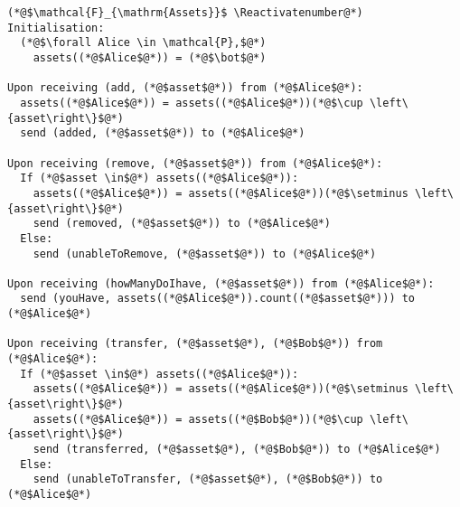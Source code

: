 \Suppressnumber
\begin{lstlisting}[label=assetsfunc, style=numbers]
(*@$\mathcal{F}_{\mathrm{Assets}}$ \Reactivatenumber@*)
Initialisation:
  (*@$\forall Alice \in \mathcal{P},$@*)
    assets((*@$Alice$@*)) = (*@$\bot$@*)

Upon receiving (add, (*@$asset$@*)) from (*@$Alice$@*):
  assets((*@$Alice$@*)) = assets((*@$Alice$@*))(*@$\cup \left\{asset\right\}$@*)
  send (added, (*@$asset$@*)) to (*@$Alice$@*)

Upon receiving (remove, (*@$asset$@*)) from (*@$Alice$@*):
  If (*@$asset \in$@*) assets((*@$Alice$@*)):
    assets((*@$Alice$@*)) = assets((*@$Alice$@*))(*@$\setminus \left\{asset\right\}$@*)
    send (removed, (*@$asset$@*)) to (*@$Alice$@*)
  Else:
    send (unableToRemove, (*@$asset$@*)) to (*@$Alice$@*)

Upon receiving (howManyDoIhave, (*@$asset$@*)) from (*@$Alice$@*):
  send (youHave, assets((*@$Alice$@*)).count((*@$asset$@*))) to (*@$Alice$@*)

Upon receiving (transfer, (*@$asset$@*), (*@$Bob$@*)) from (*@$Alice$@*):
  If (*@$asset \in$@*) assets((*@$Alice$@*)):
    assets((*@$Alice$@*)) = assets((*@$Alice$@*))(*@$\setminus \left\{asset\right\}$@*)
    assets((*@$Alice$@*)) = assets((*@$Bob$@*))(*@$\cup \left\{asset\right\}$@*)
    send (transferred, (*@$asset$@*), (*@$Bob$@*)) to (*@$Alice$@*)
  Else:
    send (unableToTransfer, (*@$asset$@*), (*@$Bob$@*)) to (*@$Alice$@*)
\end{lstlisting}
